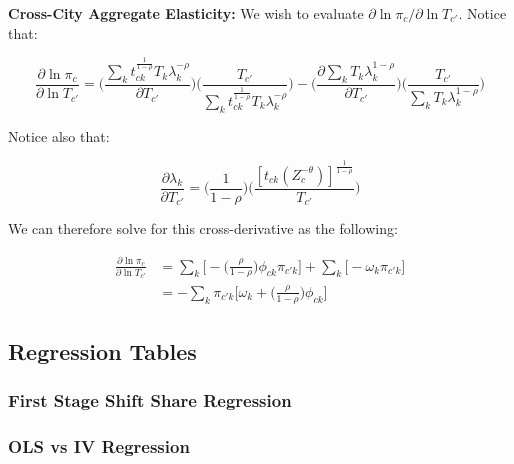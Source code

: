 \documentclass[10pt]{article}
\begin{document}
\noindent\textbf{Cross-City Aggregate Elasticity:} We wish to evaluate $\partial\ln{\pi_{c}}/\partial\ln{T_{c'}}$. Notice that:

\begin{equation*}
    \frac{\partial\ln{\pi_{c}}}{\partial\ln{T_{c'}}} = \Bigg(\frac{\sum\limits_{k}{{t^{\frac{1}{1-\rho}}_{ck}}}{T_{k}}{\lambda^{-\rho}_{k}}}{\partial{T_{c'}}}\Bigg)\Bigg(\frac{T_{c'}}{\sum\limits_{k}t^{\frac{1}{1-\rho}}_{ck}{T_{k}}{\lambda^{-\rho}_{k}}}\Bigg) - \Bigg(\frac{\partial\sum\limits_{k}{T_{k}}\lambda^{1-\rho}_{k}}{\partial{T_{c'}}}\Bigg)\Bigg(\frac{T_{c'}}{\sum\limits_{k}{T_{k}}{\lambda_{k}^{1-\rho}}}\Bigg)
\end{equation*}

Notice also that:

\begin{equation*}
    \frac{\partial\lambda_{k}}{\partial{T_{c'}}} = \Bigg(\frac{1}{1-\rho}\Bigg)\Bigg(\frac{[t_{ck}(Z_{c}^{-\theta})]^{\frac{1}{1-\rho}}}{T_{c'}}\Bigg)
\end{equation*}

We can therefore solve for this cross-derivative as the following:

\begin{align*}
    \frac{\partial\ln{\pi_{c}}}{\partial\ln{T_{c'}}} & = \sum\limits_{k}\Big[-\Big(\frac{\rho}{1-\rho}\Big)\phi_{ck}{\pi_{{c'}k}}\Big]+\sum\limits_{k}\Big[-\omega_{k}\pi_{{c'}k}\Big] \\ &= -\sum\limits_{k}{\pi_{{c'}k}}\Big[\omega_{k}+\Big(\frac{\rho}{1-\rho}\Big)\phi_{ck}\Big]
\end{align*}

\subsection{Regression Tables}

\subsubsection{First Stage Shift Share Regression}


\subsubsection{OLS vs IV Regression}


\end{document}
